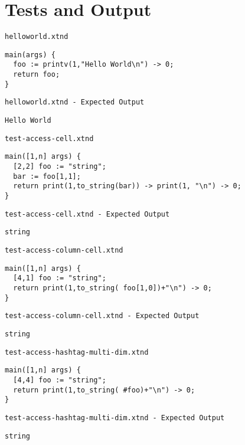 \chapter{Tests and Output}


\medskip \noindent \texttt{helloworld.xtnd}


\begin{lstlisting}
main(args) {
  foo := printv(1,"Hello World\n") -> 0;
  return foo;
}
\end{lstlisting}


\medskip \noindent \texttt{helloworld.xtnd - Expected Output}


\begin{lstlisting}
Hello World
\end{lstlisting}


\medskip \noindent \texttt{test-access-cell.xtnd}


\begin{lstlisting}
main([1,n] args) {
  [2,2] foo := "string";
  bar := foo[1,1];
  return print(1,to_string(bar)) -> print(1, "\n") -> 0;
}
\end{lstlisting}


\medskip \noindent \texttt{test-access-cell.xtnd - Expected Output}


\begin{lstlisting}
string
\end{lstlisting}


\medskip \noindent \texttt{test-access-column-cell.xtnd}


\begin{lstlisting}
main([1,n] args) {
  [4,1] foo := "string";
  return print(1,to_string( foo[1,0])+"\n") -> 0;
}
\end{lstlisting}


\medskip \noindent \texttt{test-access-column-cell.xtnd - Expected Output}


\begin{lstlisting}
string
\end{lstlisting}


\medskip \noindent \texttt{test-access-hashtag-multi-dim.xtnd}


\begin{lstlisting}
main([1,n] args) {
  [4,4] foo := "string";
  return print(1,to_string( #foo)+"\n") -> 0;
}
\end{lstlisting}


\medskip \noindent \texttt{test-access-hashtag-multi-dim.xtnd - Expected Output}


\begin{lstlisting}
string
\end{lstlisting}


